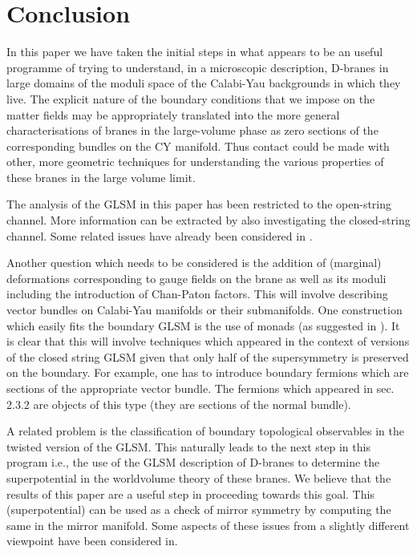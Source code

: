 \documentclass[a4paper,12pt]{article}
\begin{document}
\section{Conclusion}
  In this paper we have taken the initial steps in what appears to 
be an useful programme of trying to understand, in a microscopic
description, D-branes in large domains
of the moduli space of the Calabi-Yau backgrounds in which they live.
The explicit nature of the boundary conditions that we impose on the
matter fields may be appropriately translated into the more general
characterisations of branes in the large-volume phase as zero sections
of the corresponding bundles on the CY manifold. Thus contact could be
made with other, more geometric techniques for understanding the
various properties of these branes in the large volume limit.  

The analysis of the GLSM in this paper
has been restricted to the open-string
channel. More information can be extracted by also investigating
the closed-string channel. Some related issues have already been 
considered in \cite{HV,HIV}. 

Another question which  needs to be
considered is the addition of (marginal) deformations corresponding to
gauge fields on the brane as well as its moduli including
the introduction of Chan-Paton factors.  This will involve describing
vector bundles on Calabi-Yau manifolds or their submanifolds. One
construction which easily fits the boundary GLSM is the use of monads
(as suggested in \cite{quintic}). It is
clear that this will involve techniques which appeared in the context of
\coordHE{} versions of the closed string GLSM\cite{wittenphases,distler}
given that only half of the \coordHE{} supersymmetry is preserved on the
boundary. For example, one has to introduce boundary fermions which
are sections of the appropriate vector bundle\cite{later}. The fermions \coordHE{}
which appeared in sec. 2.3.2 are objects of this type (they are sections
of the normal bundle).

A related problem
is the classification of boundary topological  observables in
the twisted version of the GLSM. This naturally leads to 
the next step in this program i.e., the use of the GLSM
description of D-branes to determine the superpotential in the
worldvolume theory of these branes. We believe that the results of this
paper are a useful step in proceeding towards this goal.  This 
(superpotential)
can be used as a check of mirror symmetry by computing the same in the
mirror manifold. Some aspects of these issues from a slightly
different viewpoint have been considered in\cite{vafamirror,ketal,kklm2}.
\bigskip
\end{document}
